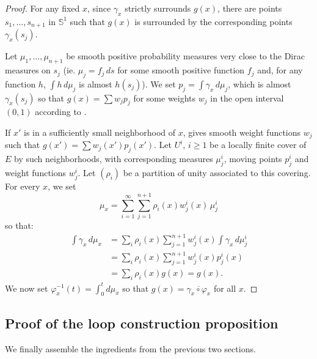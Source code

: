 \begin{proof}
  For any fixed $x$, since $γ_x$ strictly surrounds $g(x)$, there are points
  $s_1, …, s_{n+1}$ in $𝕊^1$ such that $g(x)$ is surrounded
  by the corresponding points $γ_x(s_j)$.

  Let $μ_1, …, μ_{n+1}$ be smooth positive probability measures very
  close to the Dirac measures on $s_j$ (ie. $μ_j = f_j\, ds$ for some
  smooth positive function $f_j$ and, for any function $h$,
  $\int h\,dμ_j$ is almost $h(s_j)$).  We set $p_j = \int γ_x\, d\mu_j$, which
  is almost $γ_x(s_j)$ so that $g(x) = \sum w_j p_j$ for some weights
  $w_j$ in the open interval $(0, 1)$ according to
  .

  If $x'$ is in a sufficiently small neighborhood of $x$,
   gives smooth weight functions $w_j$
  such that $g(x') = \sum w_j(x')p_j(x')$.
  Let $U^i$, $i ≥ 1$ be a locally finite cover of $E$ by such
  neighborhoods, with corresponding measures $μ_j^i$, moving points
  $p_j^i$ and weight functions $w_j^i$.
  Let $(ρ_i)$ be a partition of unity associated to this covering. For
  every $x$, we set
  \[
    μ_x = \sum_{i=1}^∞ \sum_{j=1}^{n+1} ρ_i(x)w_j^i(x)\, μ_j^i
  \]
  so that:
  \begin{align*}
    \int γ_x\, dμ_x &=
    \sum_i ρ_i(x)\sum_{j=1}^{n+1} w_j^i(x) \int γ_x\, dμ_j^i\\
    &= \sum_i ρ_i(x)\sum_{j=1}^{n+1} w_j^i(x) p_j^i(x)\\
    &= \sum_i ρ_i(x) g(x) = g(x).
  \end{align*}
  We now set $φ_x^{-1}(t) = \int_0^tdμ_x$ so that
  $g(x) = \overline{γ_x ∘ φ_x}$ for all $x$.
\end{proof}

\subsection{Proof of the loop construction proposition}
\label{sub:proof_of_the_loop_construction_proposition}

We finally assemble the ingredients from the previous two sections.

